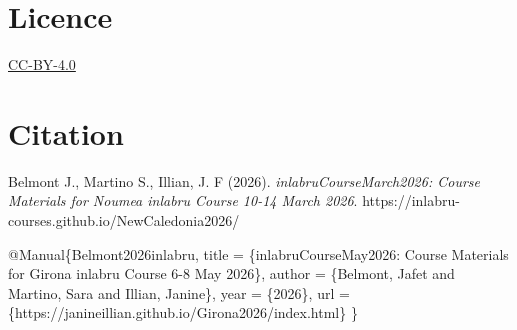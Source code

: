 \documentclass[
  letterpaper,
  DIV=11,
  numbers=noendperiod]{scrartcl}
\newenvironment{Shaded}{\begin{snugshade}}{\end{snugshade}}
\newcommand{\CommentTok}[1]{\textcolor[rgb]{0.37,0.37,0.37}{#1}}
\newcommand{\DataTypeTok}[1]{\textcolor[rgb]{0.68,0.00,0.00}{#1}}
\newcommand{\NormalTok}[1]{\textcolor[rgb]{0.00,0.23,0.31}{#1}}
\newcommand{\OtherTok}[1]{\textcolor[rgb]{0.00,0.23,0.31}{#1}}
\newcommand{\VariableTok}[1]{\textcolor[rgb]{0.07,0.07,0.07}{#1}}
\begin{document}
\section{Licence}\label{licence}

\href{https://creativecommons.org/licenses/by/4.0/}{CC-BY-4.0}

\section{Citation}\label{citation}

Belmont J., Martino S., Illian, J. F (2026).
\emph{inlabruCourseMarch2026: Course Materials for Noumea inlabru Course
10-14 March 2026}. https://inlabru-courses.github.io/NewCaledonia2026/

\begin{Shaded}
\begin{Highlighting}[]
\CommentTok{ }\VariableTok{@Manual}\NormalTok{\{}\OtherTok{Belmont2026inlabru}\NormalTok{,}
   \DataTypeTok{title}\NormalTok{ = \{inlabruCourseMay2026: Course Materials for Girona inlabru Course 6{-}8 May 2026\},}
   \DataTypeTok{author}\NormalTok{ = \{Belmont, Jafet and Martino, Sara and Illian, Janine\},}
   \DataTypeTok{year}\NormalTok{ = \{2026\},}
   \DataTypeTok{url}\NormalTok{ = \{https://janineillian.github.io/Girona2026/index.html\}}
\NormalTok{\}}
\end{Highlighting}
\end{Shaded}
\end{document}
